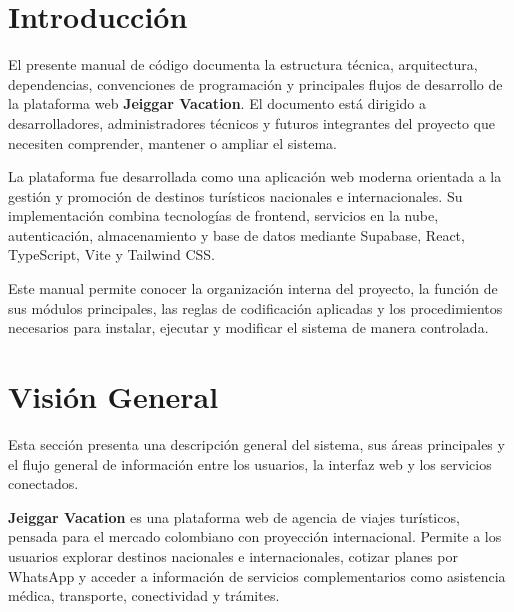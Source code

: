 \documentclass[12pt,letterpaper]{article}
\begin{document}
\newpage
\tableofcontents

\newpage
{}
\listoftables

\newpage
{}
\listoffigures

\section*{Introducción}

El presente manual de código documenta la estructura técnica, arquitectura, dependencias, convenciones de programación y principales flujos de desarrollo de la plataforma web \textbf{Jeiggar Vacation}. El documento está dirigido a desarrolladores, administradores técnicos y futuros integrantes del proyecto que necesiten comprender, mantener o ampliar el sistema.

La plataforma fue desarrollada como una aplicación web moderna orientada a la gestión y promoción de destinos turísticos nacionales e internacionales. Su implementación combina tecnologías de frontend, servicios en la nube, autenticación, almacenamiento y base de datos mediante Supabase, React, TypeScript, Vite y Tailwind CSS.

Este manual permite conocer la organización interna del proyecto, la función de sus módulos principales, las reglas de codificación aplicadas y los procedimientos necesarios para instalar, ejecutar y modificar el sistema de manera controlada.

\section{Visión General}

Esta sección presenta una descripción general del sistema, sus áreas principales y el flujo general de información entre los usuarios, la interfaz web y los servicios conectados.

\textbf{Jeiggar Vacation} es una plataforma web de agencia de viajes turísticos, pensada para el mercado colombiano con proyección internacional. Permite a los usuarios explorar destinos nacionales e internacionales, cotizar planes por WhatsApp y acceder a información de servicios complementarios como asistencia médica, transporte, conectividad y trámites.
\end{document}

